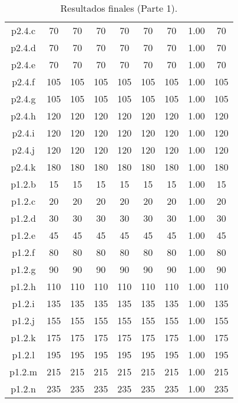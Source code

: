 \begin{table}
\begin{center}
\begin{tabular}{ |c|c|c|c|c|c|c|c|c| }
p2.4.c & 70 & 70 & 70 & 70 & 70 & 70 & 1.00 & 70  \\
p2.4.d & 70 & 70 & 70 & 70 & 70 & 70 & 1.00 & 70  \\
p2.4.e & 70 & 70 & 70 & 70 & 70 & 70 & 1.00 & 70  \\
p2.4.f & 105 & 105 & 105 & 105 & 105 & 105 & 1.00 & 105  \\
p2.4.g & 105 & 105 & 105 & 105 & 105 & 105 & 1.00 & 105  \\
p2.4.h & 120 & 120 & 120 & 120 & 120 & 120 & 1.00 & 120  \\
p2.4.i & 120 & 120 & 120 & 120 & 120 & 120 & 1.00 & 120  \\
p2.4.j & 120 & 120 & 120 & 120 & 120 & 120 & 1.00 & 120  \\
p2.4.k & 180 & 180 & 180 & 180 & 180 & 180 & 1.00 & 180  \\
p1.2.b & 15 & 15 & 15 & 15 & 15 & 15 & 1.00 & 15  \\
p1.2.c & 20 & 20 & 20 & 20 & 20 & 20 & 1.00 & 20  \\
p1.2.d & 30 & 30 & 30 & 30 & 30 & 30 & 1.00 & 30  \\
p1.2.e & 45 & 45 & 45 & 45 & 45 & 45 & 1.00 & 45  \\
p1.2.f & 80 & 80 & 80 & 80 & 80 & 80 & 1.00 & 80  \\
p1.2.g & 90 & 90 & 90 & 90 & 90 & 90 & 1.00 & 90  \\
p1.2.h & 110 & 110 & 110 & 110 & 110 & 110 & 1.00 & 110  \\
p1.2.i & 135 & 135 & 135 & 135 & 135 & 135 & 1.00 & 135  \\
p1.2.j & 155 & 155 & 155 & 155 & 155 & 155 & 1.00 & 155  \\
p1.2.k & 175 & 175 & 175 & 175 & 175 & 175 & 1.00 & 175  \\
p1.2.l & 195 & 195 & 195 & 195 & 195 & 195 & 1.00 & 195  \\
p1.2.m & 215 & 215 & 215 & 215 & 215 & 215 & 1.00 & 215  \\
p1.2.n & 235 & 235 & 235 & 235 & 235 & 235 & 1.00 & 235  \\
\hline
\end{tabular}
\end{center}
\caption{Resultados finales (Parte 1).}
\label{tab:resultadosFinales1}
\end{table}


